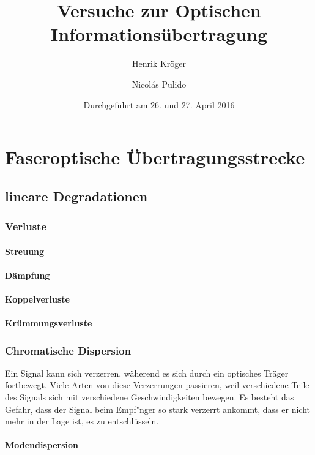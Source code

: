 \documentclass[a4paper]{article}
\title{Versuche zur Optischen Informationsübertragung}
\author{Henrik Kröger \and Nicol\'as Pulido}
\date{Durchgeführt am 26. und 27. April 2016}
\begin{document}


\maketitle


\tableofcontents

\newpage
\section{Faseroptische Übertragungsstrecke}

\subsection{lineare Degradationen}

\subsubsection{Verluste}
\paragraph{Streuung}
\paragraph{Dämpfung}
\paragraph{Koppelverluste}
\paragraph{Krümmungsverluste}

\subsubsection{Chromatische Dispersion}
Ein Signal kann sich verzerren, w\"aherend es sich durch ein optisches
Tr\"ager fortbewegt. Viele Arten von diese Verzerrungen passieren, weil
verschiedene Teile des Signals sich mit verschiedene Geschwindigkeiten
bewegen. Es besteht das Gefahr, dass der Signal beim Empf\a"nger so
stark verzerrt ankommt, dass er nicht mehr in der Lage ist, es zu
entschl\"usseln.

\paragraph{Modendispersion}
\ \\
\end{document}
